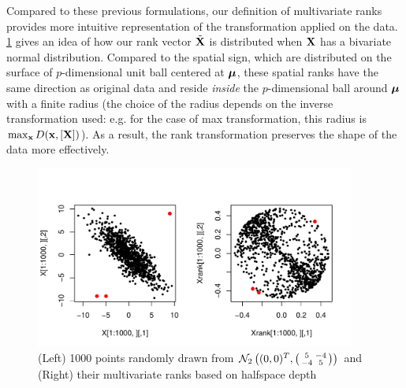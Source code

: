 Compared to these previous formulations, our definition of multivariate ranks provides more intuitive representation of the transformation applied on the data. \ref{fig:rankplot} gives an idea of how our rank vector $\tilde {{\mathbf{X}}}$ is distributed when ${\mathbf{X}}$ has a bivariate normal distribution. Compared to the spatial sign, which are distributed on the surface of $p$-dimensional unit ball centered at ${\boldsymbol{\mu}}$, these spatial ranks have the same direction as original data and reside \textit{inside} the $p$-dimensional ball around ${\boldsymbol{\mu}}$ with a finite radius (the choice of the radius depends on the inverse transformation used: e.g. for the case of max transformation, this radius is $\max_{\bf{x}} D( {\bf{x}}, [ {\mathbf{X}} ])$). As a result, the rank transformation preserves the shape of the data more effectively.

\begin{figure}
	\captionsetup{singlelinecheck=off}
	\centering
		\includegraphics[height=6cm]{ranks.pdf}
	\caption{(Left) 1000 points randomly drawn from $\mathcal N_2\left((0,0)^T, \left(\protect\begin{smallmatrix} 5 & -4 \\ -4 & 5 \protect\end{smallmatrix}\right)\right) $ and (Right) their multivariate ranks based on halfspace depth}
	\label{fig:rankplot}
\end{figure}

